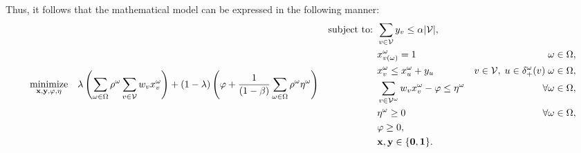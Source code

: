 \documentclass[a4paper,fleqn]{cas-sc}
\begin{document}
Thus, it follows that the mathematical model can be expressed in the following manner:
\begin{subequations}
\begin{align}
    \underset{\vb{x},\vb{y},\varphi, \vb{\eta}}{\text{minimize}} \quad &  \lambda \left(\sum_{\omega \in \Omega} \rho^\omega \sum_{v \in \mathcal{V}}w_v x_{v}^{\omega} \right) + (1-\lambda) \left (\varphi + \frac{1}{(1-\beta)} \sum_{\omega \in \Omega} \rho^\omega\eta^\omega \right)& \label{fo:min_expected4}
\end{align}
\begin{align}
    \text{subject to: } 
    & \sum_{v \in \mathcal{V}} y_{v} \leq \alpha \lvert \mathcal{V} \vert,& \label{c:capacity} \\
    & x_{v(\omega)}^{\omega} = 1 & \omega \in \Omega, \label{c:ignition} \\
    & x_{v}^{\omega} \leq x_{u}^{\omega} + y_{u} & v \in \mathcal{V},  \; u \in \delta^{\omega}_+(v) \; \omega \in \Omega,  \label{c:spread} \\
    & \sum_{v \in \mathcal{V}^{\omega} }w_v x_v^\omega - \varphi \leq \eta^\omega & \forall \omega \in \Omega, \label{c:cvar_linearization} \\
    & \eta^\omega \geq 0 &\forall \omega \in \Omega, \label{c:eta} \\
    &\varphi \geq 0, &  \label{c:domain2} \\
    & \bf{x}, \bf{y} \in \{0,1\}. \label{c:variables} 
\end{align}
\end{subequations}
\end{document}
